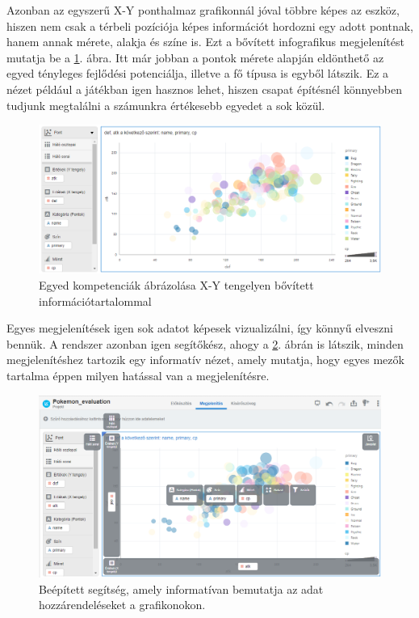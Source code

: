 	Azonban az egyszerű X-Y ponthalmaz grafikonnál jóval többre képes az eszköz, hiszen nem csak a térbeli pozíciója képes információt hordozni egy adott pontnak, hanem annak mérete, alakja és színe is. Ezt a bővített infografikus megjelenítést mutatja be a \ref{fig:pokedata2}. ábra. Itt már jobban a pontok mérete alapján eldönthető az egyed tényleges fejlődési potenciálja, illetve a fő típusa is egyből látszik. Ez a nézet például a játékban igen hasznos lehet, hiszen csapat építésnél könnyebben tudjunk megtalálni a számunkra értékesebb egyedet a sok közül.
	\begin{figure}[h!]
		\centering
		\includegraphics[width=0.85\linewidth]{dani_imgs/poke_data2}
		\caption{Egyed kompetenciák ábrázolása X-Y tengelyen bővített információtartalommal}
		\label{fig:pokedata2}
	\end{figure}

	Egyes megjelenítések igen sok adatot képesek vizualizálni, így könnyű elveszni bennük. A rendszer azonban igen segítőkész, ahogy a \ref{fig:pokedataexplain}. ábrán is látszik, minden megjelenítéshez tartozik egy informatív nézet, amely mutatja, hogy egyes mezők tartalma éppen milyen hatással van a megjelenítésre.	
	\begin{figure}[h!]
		\centering
		\includegraphics[width=0.7\linewidth]{dani_imgs/poke_data_explain}
		\caption{Beépített segítség, amely informatívan bemutatja az adat hozzárendeléseket a grafikonokon.}
		\label{fig:pokedataexplain}
	\end{figure}

	
